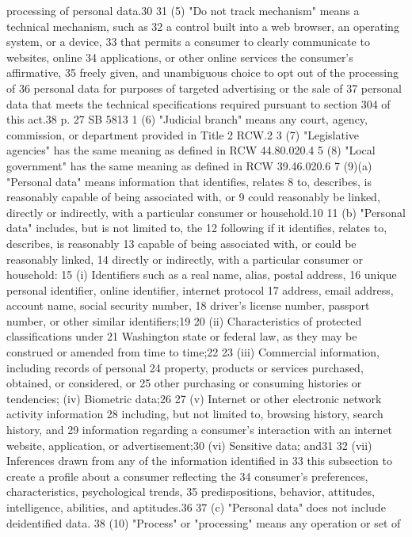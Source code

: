 processing of personal data.30
31 (5) "Do not track mechanism" means a technical mechanism, such as
32 a control built into a web browser, an operating system, or a device,
33 that permits a consumer to clearly communicate to websites, online
34 applications, or other online services the consumer's affirmative,
35 freely given, and unambiguous choice to opt out of the processing of
36 personal data for purposes of targeted advertising or the sale of
37 personal data that meets the technical specifications required
pursuant to section 304 of this act.38
p. 27 SB 5813
1 (6) "Judicial branch" means any court, agency, commission, or
department provided in Title 2 RCW.2
3 (7) "Legislative agencies" has the same meaning as defined in RCW
44.80.020.4
5 (8) "Local government" has the same meaning as defined in RCW
39.46.020.6
7 (9)(a) "Personal data" means information that identifies, relates
8 to, describes, is reasonably capable of being associated with, or
9 could reasonably be linked, directly or indirectly, with a particular
consumer or household.10
11 (b) "Personal data" includes, but is not limited to, the
12 following if it identifies, relates to, describes, is reasonably
13 capable of being associated with, or could be reasonably linked,
14 directly or indirectly, with a particular consumer or household:
15 (i) Identifiers such as a real name, alias, postal address,
16 unique personal identifier, online identifier, internet protocol
17 address, email address, account name, social security number,
18 driver's license number, passport number, or other similar
identifiers;19
20 (ii) Characteristics of protected classifications under
21 Washington state or federal law, as they may be construed or amended
from time to time;22
23 (iii) Commercial information, including records of personal
24 property, products or services purchased, obtained, or considered, or
25 other purchasing or consuming histories or tendencies;
(iv) Biometric data;26
27 (v) Internet or other electronic network activity information
28 including, but not limited to, browsing history, search history, and
29 information regarding a consumer's interaction with an internet
website, application, or advertisement;30
(vi) Sensitive data; and31
32 (vii) Inferences drawn from any of the information identified in
33 this subsection to create a profile about a consumer reflecting the
34 consumer's preferences, characteristics, psychological trends,
35 predispositions, behavior, attitudes, intelligence, abilities, and
aptitudes.36
37 (c) "Personal data" does not include deidentified data.
38 (10) "Process" or "processing" means any operation or set of
